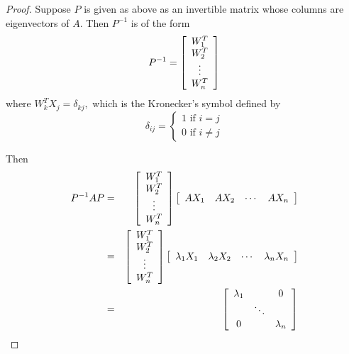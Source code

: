 \begin{proof}
Suppose $P$ is given as above as an invertible matrix whose columns are eigenvectors of $A$. Then $P^{-1}$
is of the form
\begin{equation*}
P^{-1}=\left[
\begin{array}{c}
W_{1}^{T} \\
W_{2}^{T} \\
\vdots \\
W_{n}^{T}
\end{array}
\right]
\end{equation*}
where $W_{k}^{T}X_{j}=\delta _{kj},$ which is the Kronecker's symbol defined by
\begin{equation*}
\delta _{ij}=\left\{
\begin{array}{c}
1
\text{ if }i=j \\
0\text{ if }i\neq j
\end{array}
\right.
\end{equation*}

Then
\begin{eqnarray*}
P^{-1}AP & = & 
\left[
\begin{array}{c}
W_{1}^{T} \\
W_{2}^{T} \\
\vdots \\
W_{n}^{T}
\end{array}
\right] \left[
\begin{array}{cccc}
AX_{1} & AX_{2} & \cdots & AX_{n}
\end{array}
\right] \\
& = & 
\left[
\begin{array}{c}
W_{1}^{T} \\
W_{2}^{T} \\
\vdots \\
W_{n}^{T}
\end{array}
\right] \left[
\begin{array}{cccc}
\lambda _{1}X_{1} & \lambda _{2}X_{2} & \cdots & \lambda
_{n}X_{n}
\end{array}
\right] \\
&=&
\left[
\begin{array}{ccc}
\lambda _{1} &  & 0 \\
& \ddots &  \\
0 &  & \lambda _{n}
\end{array}
\right] \\
\end{eqnarray*}


\end{proof}
